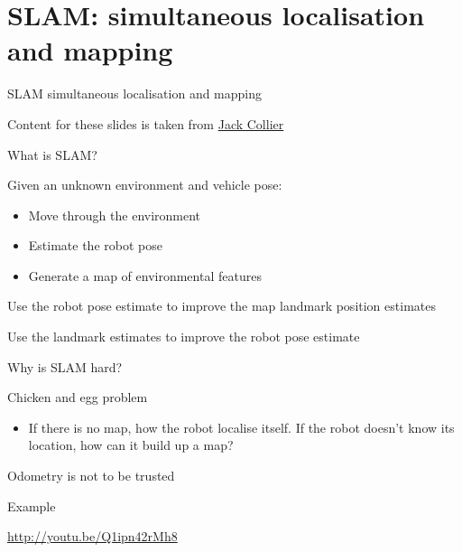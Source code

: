 \documentclass[compress]{beamer}
\begin{document}
\section{SLAM: simultaneous localisation and mapping}

\begin{frame}{SLAM simultaneous localisation and mapping}

Content for these slides is taken from
\href{http://www.computerrobotvision.org/2010/slam_camp.html}{Jack
Collier}

\end{frame}

\begin{frame}{What is SLAM?}

Given an unknown environment and vehicle pose:

\begin{itemize}
\item Move through the environment
\item Estimate the robot pose
\item Generate a map of environmental features
\end{itemize}

Use the robot pose estimate to improve the map landmark position
estimates

Use the landmark estimates to improve the robot pose estimate

\end{frame}

\begin{frame}{Why is SLAM hard?}

Chicken and egg problem

\begin{itemize}
\item If there is no map, how the robot localise itself. If the robot
  doesn't know its location, how can it build up a map?
\end{itemize}

Odometry is not to be trusted

\end{frame}

\begin{frame}{Example}

\begin{block}{\url{http://youtu.be/Q1ipn42rMh8}}

\end{block}

\end{frame}
\end{document}
